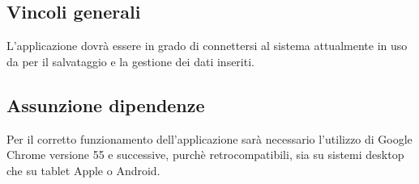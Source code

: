 \subsection{Vincoli generali}
L'applicazione dovrà essere in grado di connettersi al sistema attualmente in uso da \riskapp{} per il salvataggio e la gestione dei dati inseriti.
\subsection{Assunzione dipendenze}
Per il corretto funzionamento dell’applicazione sarà necessario l’utilizzo di Google Chrome versione 55 e successive, purchè retrocompatibili, sia su sistemi desktop  che su tablet Apple o Android.
